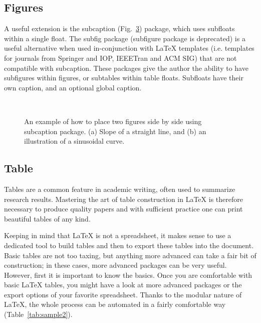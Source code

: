 \documentclass[11pt, a4paper]{article}
\begin{document}
\subsection{Figures}
A useful extension is the subcaption (Fig.~\ref{fig:subfigs cap}) package, which uses subfloats within a single float. The subfig package (subfigure package is deprecated) is a useful alternative when used in-conjunction with LaTeX templates (i.e. templates for journals from Springer and IOP, IEEETran and ACM SIG) that are not compatible with subcaption. These packages give the author the ability to have subfigures within figures, or subtables within table floats. Subfloats have their own caption, and an optional global caption.

\begin{figure}
	\centering
	\begin{subfigure}[b]{0.45\linewidth}
		\centering
		\caption{}
		\label{fig:slope}
	\end{subfigure}
	~
	\begin{subfigure}[b]{0.45\linewidth}
		\centering
		\caption{}
		\label{fig:sine-graph}
	\end{subfigure}
	\caption{An example of how to place two figures side by side using subcaption package. (a) Slope of a straight line, and (b) an illustration of a sinusoidal curve.}
	\label{fig:subfigs cap}
\end{figure}

\subsection{Table}
Tables are a common feature in academic writing, often used to summarize research results. Mastering the art of table construction in LaTeX is therefore necessary to produce quality papers and with sufficient practice one can print beautiful tables of any kind.

Keeping in mind that LaTeX is not a spreadsheet, it makes sense to use a dedicated tool to build tables and then to export these tables into the document. Basic tables are not too taxing, but anything more advanced can take a fair bit of construction; in these cases, more advanced packages can be very useful. However, first it is important to know the basics. Once you are comfortable with basic LaTeX tables, you might have a look at more advanced packages or the export options of your favorite spreadsheet. Thanks to the modular nature of LaTeX, the whole process can be automated in a fairly comfortable way (Table~\ref{tab:sample2}).
\end{document}
